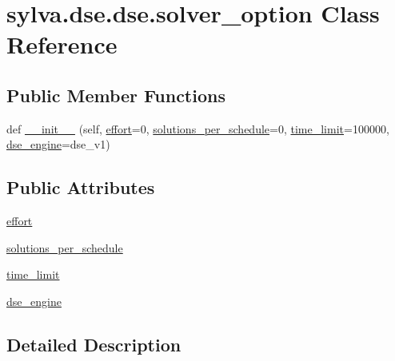 \hypertarget{classsylva_1_1dse_1_1dse_1_1solver__option}{}\section{sylva.\+dse.\+dse.\+solver\+\_\+option Class Reference}
\label{classsylva_1_1dse_1_1dse_1_1solver__option}
\subsection*{Public Member Functions}
\begin{DoxyCompactItemize}
\item 
def \hyperlink{classsylva_1_1dse_1_1dse_1_1solver__option_a9dc8c1ee5f29aeabb4b6587974adfbec}{\+\_\+\+\_\+init\+\_\+\+\_\+} (self, \hyperlink{classsylva_1_1dse_1_1dse_1_1solver__option_a1cd7045a515dfd0b3d5502da487ef4e5}{effort}=0, \hyperlink{classsylva_1_1dse_1_1dse_1_1solver__option_a4bb3e9d8e2a3e8f95a39f414d0bc19f8}{solutions\+\_\+per\+\_\+schedule}=0, \hyperlink{classsylva_1_1dse_1_1dse_1_1solver__option_afaf7c917b79ce8a22c1b5e3743d95787}{time\+\_\+limit}=100000, \hyperlink{classsylva_1_1dse_1_1dse_1_1solver__option_a7a53af2287a6078049559a565fbb9e90}{dse\+\_\+engine}=dse\+\_\+v1)
\end{DoxyCompactItemize}
\subsection*{Public Attributes}
\begin{DoxyCompactItemize}
\item 
\hyperlink{classsylva_1_1dse_1_1dse_1_1solver__option_a1cd7045a515dfd0b3d5502da487ef4e5}{effort}
\item 
\hyperlink{classsylva_1_1dse_1_1dse_1_1solver__option_a4bb3e9d8e2a3e8f95a39f414d0bc19f8}{solutions\+\_\+per\+\_\+schedule}
\item 
\hyperlink{classsylva_1_1dse_1_1dse_1_1solver__option_afaf7c917b79ce8a22c1b5e3743d95787}{time\+\_\+limit}
\item 
\hyperlink{classsylva_1_1dse_1_1dse_1_1solver__option_a7a53af2287a6078049559a565fbb9e90}{dse\+\_\+engine}
\end{DoxyCompactItemize}


\subsection{Detailed Description}


